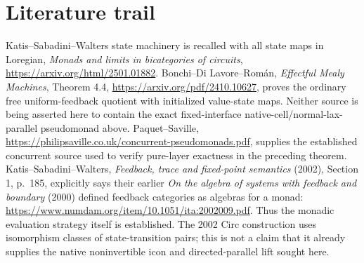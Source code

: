 \documentclass{article}
\begin{document}
\section{Literature trail}
Katis--Sabadini--Walters state machinery is recalled with all state maps in Loregian, \emph{Monads and limits in bicategories of circuits}, \url{https://arxiv.org/html/2501.01882}. Bonchi--Di Lavore--Rom\'an, \emph{Effectful Mealy Machines}, Theorem 4.4, \url{https://arxiv.org/pdf/2410.10627}, proves the ordinary free uniform-feedback quotient with initialized value-state maps. Neither source is being asserted here to contain the exact fixed-interface native-cell/normal-lax-parallel pseudomonad above. Paquet--Saville, \url{https://philipsaville.co.uk/concurrent-pseudomonads.pdf}, supplies the established concurrent source used to verify pure-layer exactness in the preceding theorem. Katis--Sabadini--Walters, \emph{Feedback, trace and fixed-point semantics} (2002), Section 1, p.~185, explicitly says their earlier \emph{On the algebra of systems with feedback and boundary} (2000) defined feedback categories as algebras for a monad: \url{https://www.numdam.org/item/10.1051/ita:2002009.pdf}. Thus the monadic evaluation strategy itself is established. The 2002 Circ construction uses isomorphism classes of state-transition pairs; this is not a claim that it already supplies the native noninvertible icon and directed-parallel lift sought here.
\end{document}
